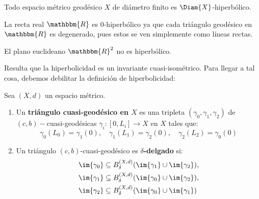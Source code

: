 \documentclass[12pt]{report}
\theoremstyle{largebreak}
\newcommand\cf[3]{\ensuremath{#1:#2\rightarrow#3}}
\newcommand{\bbm}[1]{\ensuremath{\mathbbm{#1}}}
\begin{document}
    \begin{exa}
        Todo espacio métrico geodésico $X$ de diámetro finito es $\Diam{X}$-hiperbólico. 
    \end{exa}

    \begin{exa}
        La recta real $\bbm{R}$ es $0$-hiperbólico ya que cada triángulo geodésico en $\bbm{R}$ es degenerado, pues estos se ven simplemente como líneas rectas.
    \end{exa}

    \begin{exa}
        El plano euclideano $\bbm{R}^2$ no es hiperbólico.
    \end{exa}


    Resulta que la hiperbolicidad es un invariante cuasi-isométrico. Para llegar a tal cosa, debemos debilitar la definición de hiperbolicidad:

    \begin{mydef}
        Sea $(X,d)$ un espacio métrico.
        \begin{enumerate}[label = \textit{\arabic*}]
            \item Un \textbf{triángulo cuasi-geodésico en $X$} es una tripleta $(\gamma_0,\gamma_1,\gamma_2)$ de $(c,b)-$cuasi-geodésicas $\cf{\gamma_i}{[0,L_i]}{X}$ en $X$ tales que:
            \begin{equation*}
                \gamma_0(L_0)=\gamma_1(0),\quad \gamma_1(L_1)=\gamma_2(0),\quad \gamma_2(L_2)=\gamma_0(0)
            \end{equation*}
            \item Un triángulo $(c,b)$-cuasi-geodésico es \textbf{$\delta$-delgado} si:
            \begin{equation*}
                \begin{split}
                    \im{\gamma_0}&\subseteq B_{\delta}^{(X,d)}(\im{\gamma_1}\cup\im{\gamma_2}),\\
                    \im{\gamma_1}&\subseteq B_{\delta}^{(X,d)}(\im{\gamma_0}\cup\im{\gamma_2}),\\
                    \im{\gamma_2}&\subseteq B_{\delta}^{(X,d)}(\im{\gamma_0}\cup\im{\gamma_1})\\
                \end{split}
            \end{equation*}
        \end{enumerate}
    \end{mydef}
\end{document}
